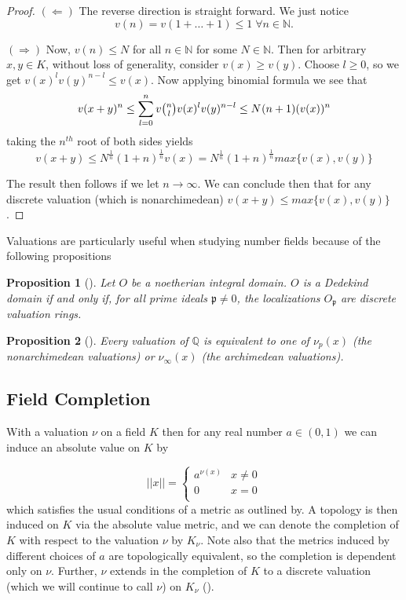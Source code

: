 \documentclass[paper=a4, fontsize=11pt]{scrartcl} %
\numberwithin{equation}{section} %
\numberwithin{figure}{section} %
\numberwithin{table}{section} %
\theoremstyle{break}
\newtheorem{prop}{Proposition}
\begin{document}
\begin{proof}
$(\Leftarrow)$ The reverse direction is straight forward. We just notice 
$$v(n)=v(1+\ldots+1) \leq 1\; \forall n\in\mathbb{N}.$$

$(\Rightarrow)$ Now, $v(n) \leq N$ for all $n\in\mathbb{N}$ for some $N \in \mathbb{N}$. Then for arbitrary $x,y\in K$, without loss of generality, consider $v(x) \geq v(y)$. Choose $l \geq 0$, so we get $v(x)^{l}v(y)^{n-l} \leq v(x)$. Now applying binomial formula we see that
$$
	v(x+y)^{n} \leq \sum_{l=0}^{n} v\tbinom{n}{l} v(x)^l v(y)^{n-l} \leq N^{}(n+1)(v(x))^n
$$
taking the $n^{th}$ root of both sides yields
$$
v(x+y) \leq N^{\frac{1}{n}}(1+n)^{\frac{1}{n}} v(x) = N^{\frac{1}{n}}(1+n)^{\frac{1}{n}} max\{v(x), v(y) \}
$$

The result then follows if we let $n \to \infty$. We can conclude then that for any discrete valuation (which is nonarchimedean) $v(x+y) \leq max \{v(x),v(y) \}$.
\end{proof}

Valuations are particularly useful when studying number fields because of the following propositions
\begin{prop}[\cite{Neukirch}]
Let $O$ be a noetherian integral domain. $O$ is a Dedekind domain if and only if, for all prime ideals $\mathfrak{p} \not= 0$, the localizations $O_\mathfrak{p}$ are discrete valuation rings.
\end{prop}
\begin{prop}[\cite{Neukirch}]
Every valuation of $\mathbb{Q}$ is equivalent to one of $\nu_p(x)$ (the nonarchimedean valuations) or $\nu_\infty(x)$ (the archimedean valuations).
\end{prop}

\subsection{Field Completion}
With a valuation $\nu$ on a field $K$ then for any real number $a\in(0,1)$ we can induce an absolute value on $K$ by

\[ ||x|| =  \begin{cases} 
      a^{\nu(x)} & x \not= 0 \\
      0 & x = 0 \\
   \end{cases}
\]
which satisfies the usual conditions of a metric as outlined by. A topology is then induced on $K$ via the absolute value metric, and we can denote the completion of $K$ with respect to the valuation $\nu$ by $K_\nu$. Note also that the metrics induced by different choices of $a$ are topologically equivalent, so the completion is dependent only on $\nu$. Further, $\nu$ extends in the completion of $K$ to a discrete valuation (which we will continue to call $\nu$) on $K_\nu$ (\cite{Serre}).
\end{document}
